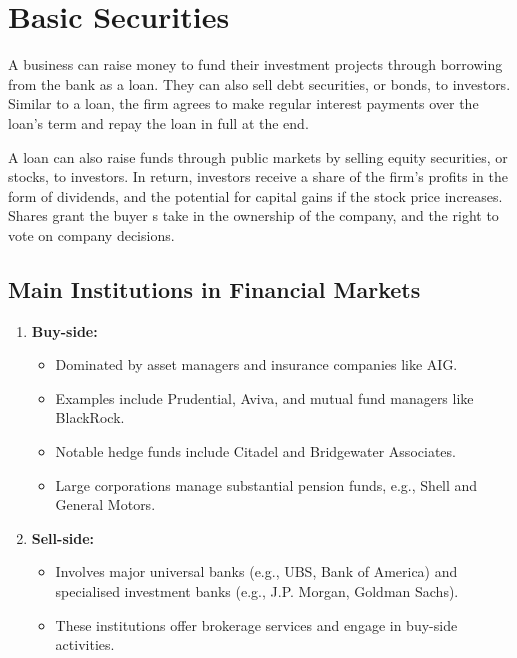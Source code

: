 \section{Basic Securities}

A business can raise money to fund their investment projects through borrowing from the bank as a loan. They can also sell debt securities, or bonds, to investors. Similar to a loan, the firm agrees to make regular interest payments over the loan's term and repay the loan in full at the end.

A loan can also raise funds through public markets by selling equity securities, or stocks, to investors. In return, investors receive a share of the firm's profits in the form of dividends, and the potential for capital gains if the stock price increases. Shares grant the buyer s take in the ownership of the company, and the right to vote on company decisions.

\subsection*{Main Institutions in Financial Markets}

\begin{enumerate}
    \item \textbf{Buy-side:}
    \begin{itemize}[noitemsep]
        \item Dominated by asset managers and insurance companies like AIG.
        \item Examples include Prudential, Aviva, and mutual fund managers like BlackRock.
        \item Notable hedge funds include Citadel and Bridgewater Associates.
        \item Large corporations manage substantial pension funds, e.g., Shell and General Motors.
    \end{itemize}
    
    \item \textbf{Sell-side:}
    \begin{itemize}[noitemsep]
        \item Involves major universal banks (e.g., UBS, Bank of America) and specialised investment banks (e.g., J.P. Morgan, Goldman Sachs).
        \item These institutions offer brokerage services and engage in buy-side activities.
    \end{itemize}
\end{enumerate}


